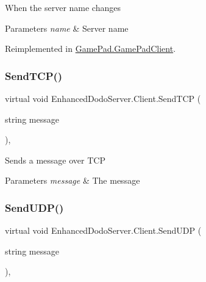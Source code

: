 When the server name changes 


\begin{DoxyParams}{Parameters}
{\em name} & Server name\\
\hline
\end{DoxyParams}


Reimplemented in \mbox{\hyperlink{class_game_pad_1_1_game_pad_client_afca4e18b9b18482ce56f82e7f1fdd639}{Game\+Pad.\+Game\+Pad\+Client}}.

\mbox{\label{class_enhanced_dodo_server_1_1_client_a544f2325afe25591a1db8bee3902ed98}} 
\subsubsection{\texorpdfstring{SendTCP()}{SendTCP()}}
{\footnotesize\ttfamily virtual void Enhanced\+Dodo\+Server.\+Client.\+Send\+T\+CP (\begin{DoxyParamCaption}\item[{string}]{message }\end{DoxyParamCaption})\hspace{0.3cm}{\ttfamily [protected]}, {\ttfamily [virtual]}}



Sends a message over T\+CP 


\begin{DoxyParams}{Parameters}
{\em message} & The message\\
\hline
\end{DoxyParams}
\mbox{\label{class_enhanced_dodo_server_1_1_client_a04448d0ac12be1706d4f5e3d2888c3be}} 
\subsubsection{\texorpdfstring{SendUDP()}{SendUDP()}}
{\footnotesize\ttfamily virtual void Enhanced\+Dodo\+Server.\+Client.\+Send\+U\+DP (\begin{DoxyParamCaption}\item[{string}]{message }\end{DoxyParamCaption})\hspace{0.3cm}{\ttfamily [protected]}, {\ttfamily [virtual]}}



